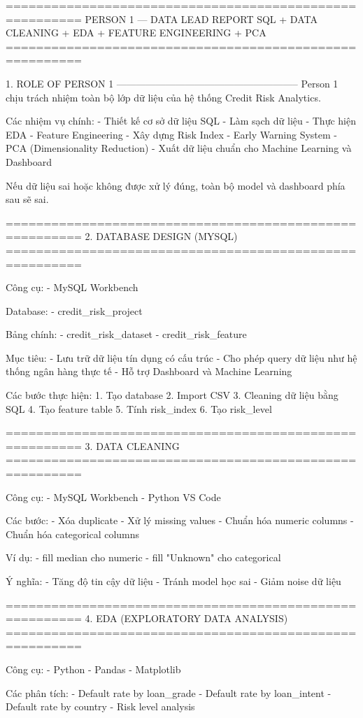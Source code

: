 ========================================================
PERSON 1 — DATA LEAD REPORT
SQL + DATA CLEANING + EDA + FEATURE ENGINEERING + PCA
========================================================

1. ROLE OF PERSON 1
--------------------------------------------------------
Person 1 chịu trách nhiệm toàn bộ lớp dữ liệu của hệ thống
Credit Risk Analytics.

Các nhiệm vụ chính:
- Thiết kế cơ sở dữ liệu SQL
- Làm sạch dữ liệu
- Thực hiện EDA
- Feature Engineering
- Xây dựng Risk Index
- Early Warning System
- PCA (Dimensionality Reduction)
- Xuất dữ liệu chuẩn cho Machine Learning và Dashboard

Nếu dữ liệu sai hoặc không được xử lý đúng,
toàn bộ model và dashboard phía sau sẽ sai.

========================================================
2. DATABASE DESIGN (MYSQL)
========================================================

Công cụ:
- MySQL Workbench

Database:
- credit_risk_project

Bảng chính:
- credit_risk_dataset
- credit_risk_feature

Mục tiêu:
- Lưu trữ dữ liệu tín dụng có cấu trúc
- Cho phép query dữ liệu như hệ thống ngân hàng thực tế
- Hỗ trợ Dashboard và Machine Learning

Các bước thực hiện:
1. Tạo database
2. Import CSV
3. Cleaning dữ liệu bằng SQL
4. Tạo feature table
5. Tính risk_index
6. Tạo risk_level

========================================================
3. DATA CLEANING
========================================================

Công cụ:
- MySQL Workbench
- Python VS Code

Các bước:
- Xóa duplicate
- Xử lý missing values
- Chuẩn hóa numeric columns
- Chuẩn hóa categorical columns

Ví dụ:
- fill median cho numeric
- fill "Unknown" cho categorical

Ý nghĩa:
- Tăng độ tin cậy dữ liệu
- Tránh model học sai
- Giảm noise dữ liệu

========================================================
4. EDA (EXPLORATORY DATA ANALYSIS)
========================================================

Công cụ:
- Python
- Pandas
- Matplotlib

Các phân tích:
- Default rate by loan_grade
- Default rate by loan_intent
- Default rate by country
- Risk level analysis

